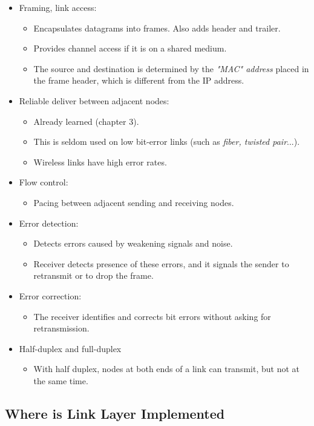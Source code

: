 \documentclass{article}
\begin{document}
\begin{itemize}
\item Framing, link access:
\begin{itemize}
\item Encapsulates datagrams into frames. Also adds header and trailer.
\item Provides channel access if it is on a shared medium.
\item The source and destination is determined by the \emph{"MAC" address} placed in the frame header, which is different from the IP address.
\end{itemize}
\item Reliable deliver between adjacent nodes:
\begin{itemize}
\item Already learned (chapter 3).
\item This is seldom used on low bit-error links (such as \emph{fiber, twisted pair}...).
\item Wireless links have high error rates.
\end{itemize}
\item Flow control:
\begin{itemize}
\item Pacing between adjacent sending and receiving nodes.
\end{itemize}
\item Error detection:
\begin{itemize}
\item Detects errors caused by weakening signals and noise.
\item Receiver detects presence of these errors, and it signals the sender to retransmit or to drop the frame.
\end{itemize}
\item Error correction:
\begin{itemize}
\item The receiver identifies and corrects bit errors without asking for retransmission.
\end{itemize}
\item Half-duplex and full-duplex
\begin{itemize}
\item With half duplex, nodes at both ends of a link can transmit, but not at the same time.
\end{itemize}
\end{itemize}

\subsection{Where is Link Layer Implemented}
\end{document}
